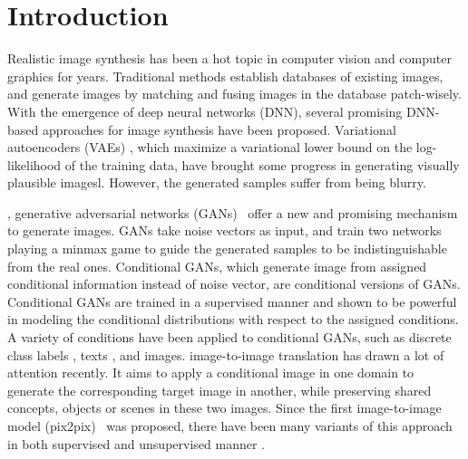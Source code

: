\section{Introduction}
Realistic image synthesis has been a hot topic in computer vision and computer graphics for years. 
Traditional methods \cite{EBSR, TextureSyn,SceneCompletion} establish databases of existing images, and generate images by matching and fusing images in the database patch-wisely. 
With the emergence of deep neural networks (DNN), several promising DNN-based approaches for image synthesis have been proposed. 
Variational autoencoders (VAEs) \cite{VAEs}, which maximize a variational lower bound on the log-likelihood of the training data, have brought some progress in generating visually plausible imagesl. However, the generated samples suffer from being blurry. 
%

, generative adversarial networks (GANs)~\cite{GANs} offer a new and promising mechanism to generate images.
GANs take noise vectors as input, and train two networks playing a minmax game to guide the generated samples to be indistinguishable from the real ones. 
Conditional GANs, which generate image from assigned conditional information instead of noise vector, are conditional versions of GANs. 
Conditional GANs are trained in a supervised manner and shown to be powerful in modeling the conditional distributions with respect to the assigned conditions. 
A variety of conditions have been applied to conditional GANs, such as discrete class labels \cite{cGANs}, texts \cite{StackGANs, StackGANs++}, and images.
%
 image-to-image translation has drawn a lot of attention recently.
It aims to apply a conditional image in one domain to generate the corresponding target image in another, while preserving shared concepts, objects or scenes in these two images. 
Since the first image-to-image model (pix2pix)~\cite{pix2pix} was proposed, there have been many variants of this approach in both supervised and unsupervised manner \cite{CycleGANs, DualGANs,CoupleGANs,BicycleGANs}. %


